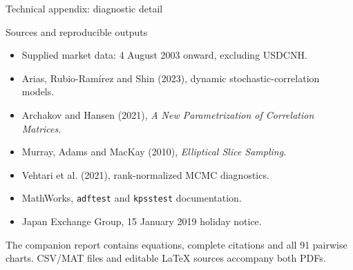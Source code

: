 \documentclass[aspectratio=169,11pt]{beamer}
\begin{document}
\begin{frame}{Technical appendix: diagnostic detail}

\end{frame}
\begin{frame}{Sources and reproducible outputs}
\small
\begin{itemize}
\item Supplied market data: 4 August 2003 onward, excluding USDCNH.
\item Arias, Rubio-Ram\'irez and Shin (2023), dynamic stochastic-correlation models.
\item Archakov and Hansen (2021), \emph{A New Parametrization of Correlation Matrices}.
\item Murray, Adams and MacKay (2010), \emph{Elliptical Slice Sampling}.
\item Vehtari et al. (2021), rank-normalized MCMC diagnostics.
\item MathWorks, \texttt{adftest} and \texttt{kpsstest} documentation.
\item Japan Exchange Group, 15 January 2019 holiday notice.
\end{itemize}
\vfill\small The companion report contains equations, complete citations and all 91 pairwise charts. CSV/MAT files and editable LaTeX sources accompany both PDFs.
\end{frame}
\end{document}
